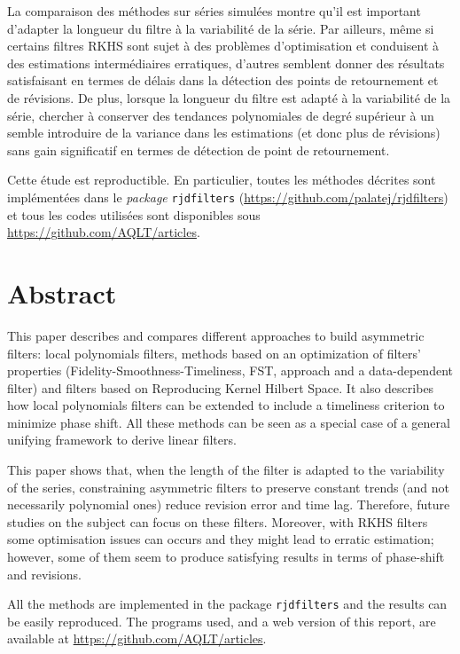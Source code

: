 La comparaison des méthodes sur séries simulées montre qu'il est
important d'adapter la longueur du filtre à la variabilité de la série.
Par ailleurs, même si certains filtres RKHS sont sujet à des problèmes
d'optimisation et conduisent à des estimations intermédiaires
erratiques, d'autres semblent donner des résultats satisfaisant en
termes de délais dans la détection des points de retournement et de
révisions. De plus, lorsque la longueur du filtre est adapté à la
variabilité de la série, chercher à conserver des tendances polynomiales
de degré supérieur à un semble introduire de la variance dans les
estimations (et donc plus de révisions) sans gain significatif en termes
de détection de point de retournement.

Cette étude est reproductible. En particulier, toutes les méthodes
décrites sont implémentées dans le \emph{package} 
\texttt{rjdfilters} (\url{https://github.com/palatej/rjdfilters}) et
tous les codes utilisées sont disponibles sous
\url{https://github.com/AQLT/articles}.

\hypertarget{abstract}{%
\section*{Abstract}\label{abstract}}

This paper describes and compares different approaches to build
asymmetric filters: local polynomials filters, methods based on an
optimization of filters' properties (Fidelity-Smoothness-Timeliness,
FST, approach and a data-dependent filter) and filters based on
Reproducing Kernel Hilbert Space. It also describes how local
polynomials filters can be extended to include a timeliness criterion to
minimize phase shift. All these methods can be seen as a special case of
a general unifying framework to derive linear filters.

This paper shows that, when the length of the filter is adapted to the
variability of the series, constraining asymmetric filters to preserve
constant trends (and not necessarily polynomial ones) reduce revision
error and time lag. Therefore, future studies on the subject can focus
on these filters. Moreover, with RKHS filters some optimisation issues
can occurs and they might lead to erratic estimation; however, some of
them seem to produce satisfying results in terms of phase-shift and
revisions.

All the methods are implemented in the  package
\texttt{rjdfilters} and the results can be easily reproduced. The
programs used, and a web version of this report, are available at
\url{https://github.com/AQLT/articles}.

\newpage
